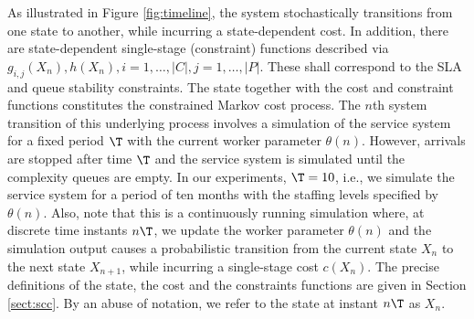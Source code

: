 \documentclass[11pt,letterpaper,english]{article}
\begin{document}
As illustrated in Figure \ref{fig:timeline}, the system stochastically transitions
from one state to another, while incurring a state-dependent cost. In addition,
there are state-dependent single-stage (constraint) functions described via 
$g_{i,j}(X_n), h(X_n), i = 1, \dots, |C|, j = 1, \dots, |P|$. These shall
correspond to the SLA and queue stability constraints. The state together with
the cost and constraint functions constitutes the constrained Markov cost
process. The $n$th system transition of this underlying process involves a
simulation of the service system for a fixed period $\T$ with the current worker
parameter $\theta(n)$. However, 
arrivals are stopped after time $\T$ and the service system is simulated until
the complexity queues are empty. In our experiments, $\T = 10$,
i.e., we simulate the service system for a period of ten months with the
staffing levels specified by $\theta(n)$. 
Also, note that this is a continuously running
simulation where, at discrete time instants $n\T$,
we update the worker parameter $\theta(n)$ and the simulation output causes a
probabilistic transition from the current state $X_n$ to the next state
$X_{n+1}$, while incurring a single-stage cost $c(X_n)$.  The precise
definitions of the state, the cost and the constraints functions are given in
Section \ref{sect:scc}. By an abuse of notation, we refer to the state at
instant $n\T$ as $X_n$.
\end{document}
